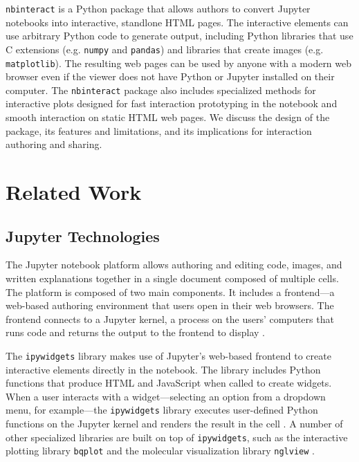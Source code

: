 \documentclass[nobib]{tufte-handout}
\newcommand{\code}[1]{\texttt{#1}}
\begin{document}
\code{nbinteract} is a Python package that allows authors to convert Jupyter
notebooks into interactive, standlone HTML pages. The interactive elements can
use arbitrary Python code to generate output, including Python libraries that
use C extensions (e.g. \code{numpy} and \code{pandas}) and libraries that
create images (e.g. \code{matplotlib}). The resulting web pages can be used by
anyone with a modern web browser even if the viewer does not have Python or
Jupyter installed on their computer. The \code{nbinteract} package also
includes specialized methods for interactive plots designed for fast
interaction prototyping in the notebook and smooth interaction on static HTML
web pages. We discuss the design of the package, its features and limitations,
and its implications for interaction authoring and sharing.


\section{Related Work} %
\label{sec:related_work}

\subsection{Jupyter Technologies} %
\label{sub:jupyter_technologies}

The Jupyter notebook platform allows authoring and editing code, images, and
written explanations together in a single document composed of multiple cells.
The platform is composed of two main components. It includes a frontend---a
web-based authoring environment that users open in their web browsers. The
frontend connects to a Jupyter kernel, a process on the users' computers that
runs code and returns the output to the frontend to display
\cite{thomas_jupyter_2016}.

The \code{ipywidgets} library makes use of Jupyter's web-based frontend to
create interactive elements directly in the notebook. The library includes
Python functions that produce HTML and JavaScript when called to create
widgets. When a user interacts with a widget---selecting an option from a
dropdown menu, for example---the \code{ipywidgets} library executes
user-defined Python functions on the Jupyter kernel and renders the result in
the cell \cite{_jupyter-widgets/ipywidgets_}. A number of other specialized
libraries are built on top of \code{ipywidgets}, such as the interactive
plotting library \code{bqplot} \cite{_bqplot_2018} and the molecular
visualization library \code{nglview} \cite{_arose/nglview_}.
\end{document}
